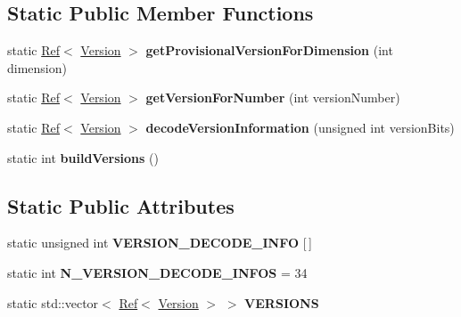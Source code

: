 \subsection*{Static Public Member Functions}
\begin{DoxyCompactItemize}
\item 
\mbox{\label{classzxing_1_1qrcode_1_1_version_a41a1f541bfb448eab35000af20d84f30}} 
static \mbox{\hyperlink{classzxing_1_1_ref}{Ref}}$<$ \mbox{\hyperlink{classzxing_1_1qrcode_1_1_version}{Version}} $>$ {\bfseries get\+Provisional\+Version\+For\+Dimension} (int dimension)
\item 
\mbox{\label{classzxing_1_1qrcode_1_1_version_ab176eb5a8ce4169b475dd659ed3ed416}} 
static \mbox{\hyperlink{classzxing_1_1_ref}{Ref}}$<$ \mbox{\hyperlink{classzxing_1_1qrcode_1_1_version}{Version}} $>$ {\bfseries get\+Version\+For\+Number} (int version\+Number)
\item 
\mbox{\label{classzxing_1_1qrcode_1_1_version_a5afc0999bfa38a5031da63f1029827d9}} 
static \mbox{\hyperlink{classzxing_1_1_ref}{Ref}}$<$ \mbox{\hyperlink{classzxing_1_1qrcode_1_1_version}{Version}} $>$ {\bfseries decode\+Version\+Information} (unsigned int version\+Bits)
\item 
\mbox{\label{classzxing_1_1qrcode_1_1_version_a0a083d64bd0bd148c21c8b43c3b1db72}} 
static int {\bfseries build\+Versions} ()
\end{DoxyCompactItemize}
\subsection*{Static Public Attributes}
\begin{DoxyCompactItemize}
\item 
static unsigned int {\bfseries V\+E\+R\+S\+I\+O\+N\+\_\+\+D\+E\+C\+O\+D\+E\+\_\+\+I\+N\+FO} \mbox{[}$\,$\mbox{]}
\item 
\mbox{\label{classzxing_1_1qrcode_1_1_version_a7ab210c67a319ff0f06ac7e91a2eade7}} 
static int {\bfseries N\+\_\+\+V\+E\+R\+S\+I\+O\+N\+\_\+\+D\+E\+C\+O\+D\+E\+\_\+\+I\+N\+F\+OS} = 34
\item 
\mbox{\label{classzxing_1_1qrcode_1_1_version_ad5bbfae5b8164ba937947fb3de366438}} 
static std\+::vector$<$ \mbox{\hyperlink{classzxing_1_1_ref}{Ref}}$<$ \mbox{\hyperlink{classzxing_1_1qrcode_1_1_version}{Version}} $>$ $>$ {\bfseries V\+E\+R\+S\+I\+O\+NS}
\end{DoxyCompactItemize}


